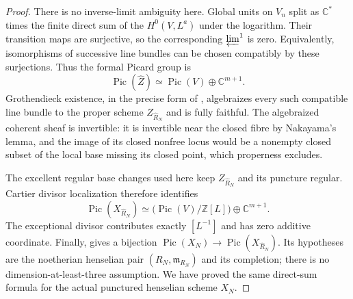 \begin{proof}
There is no inverse-limit ambiguity here. Global units
on $V_n$ split as $\mathbb C^*$ times the finite direct
sum of the $H^0(V,L^a)$ under the logarithm. Their
transition maps are surjective, so the corresponding
$\varprojlim^1$ is zero. Equivalently, isomorphisms of
successive line bundles can be chosen compatibly by
these surjections. Thus the formal Picard group is
\[
 \operatorname{Pic}(\widehat Z)
       \simeq\operatorname{Pic}(V)\oplus\mathbb C^{m+1}.
\]
Grothendieck existence, in the precise form of
\citet[Theorem 30.27.1, Tag 088E]{rootStacksExistence},
algebraizes every such compatible line bundle to the
proper scheme $Z_{\widehat R_N}$ and is fully faithful.
The algebraized coherent sheaf is invertible: it is
invertible near the closed fibre by Nakayama's lemma,
and the image of its closed nonfree locus would be a
nonempty closed subset of the local base missing its
closed point, which properness excludes.

The excellent regular base changes used here keep
$Z_{\widehat R_N}$ and its puncture regular. Cartier
divisor localization therefore identifies
\[
 \operatorname{Pic}(X_{\widehat R_N})
   \simeq
   \bigl(\operatorname{Pic}(V)/\mathbb Z[L]\bigr)
                                      \oplus\mathbb C^{m+1}.
\]
The exceptional divisor contributes exactly $[L^{-1}]$
and has zero additive coordinate. Finally,
\citet[Section III, Theorem 3, p.~569, and its unnumbered
Picard corollary, p.~573]{D_Elkik1973}
gives a bijection
$\operatorname{Pic}(X_N)\to\operatorname{Pic}(X_{\widehat R_N})$.
Its hypotheses are the noetherian henselian pair
$(R_N,\mathfrak m_{R_N})$ and its completion; there is no
dimension-at-least-three assumption. We have proved the
same direct-sum formula for the actual punctured
henselian scheme $X_N$.


\end{proof}
